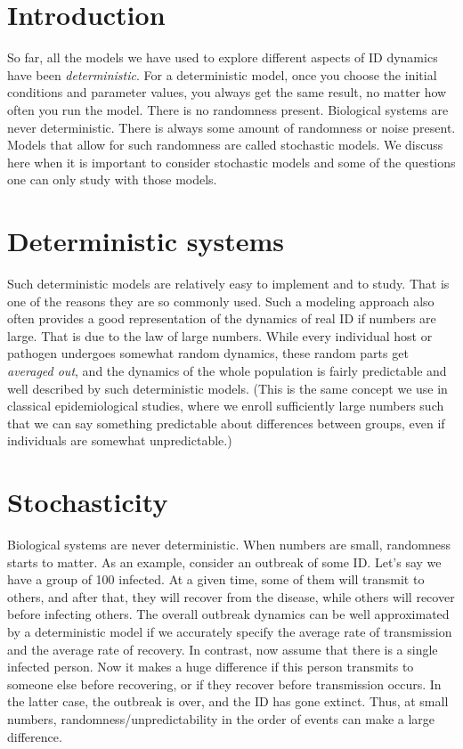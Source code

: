 \documentclass[]{book}
\theoremstyle{definition}
\theoremstyle{definition}
\theoremstyle{definition}
\theoremstyle{remark}
\begin{document}
\hypertarget{introduction-7}{%
\section{Introduction}\label{introduction-7}}

So far, all the models we have used to explore different aspects of ID
dynamics have been \emph{deterministic}. For a deterministic model, once
you choose the initial conditions and parameter values, you always get
the same result, no matter how often you run the model. There is no
randomness present. Biological systems are never deterministic. There is
always some amount of randomness or noise present. Models that allow for
such randomness are called stochastic models. We discuss here when it is
important to consider stochastic models and some of the questions one
can only study with those models.

\hypertarget{deterministic-systems}{%
\section{Deterministic systems}\label{deterministic-systems}}

Such deterministic models are relatively easy to implement and to study.
That is one of the reasons they are so commonly used. Such a modeling
approach also often provides a good representation of the dynamics of
real ID if numbers are large. That is due to the law of large numbers.
While every individual host or pathogen undergoes somewhat random
dynamics, these random parts get \emph{averaged out}, and the dynamics
of the whole population is fairly predictable and well described by such
deterministic models. (This is the same concept we use in classical
epidemiological studies, where we enroll sufficiently large numbers such
that we can say something predictable about differences between groups,
even if individuals are somewhat unpredictable.)

\hypertarget{stochasticity}{%
\section{Stochasticity}\label{stochasticity}}

Biological systems are never deterministic. When numbers are small,
randomness starts to matter. As an example, consider an outbreak of some
ID. Let's say we have a group of 100 infected. At a given time, some of
them will transmit to others, and after that, they will recover from the
disease, while others will recover before infecting others. The overall
outbreak dynamics can be well approximated by a deterministic model if
we accurately specify the average rate of transmission and the average
rate of recovery. In contrast, now assume that there is a single
infected person. Now it makes a huge difference if this person transmits
to someone else before recovering, or if they recover before
transmission occurs. In the latter case, the outbreak is over, and the
ID has gone extinct. Thus, at small numbers, randomness/unpredictability
in the order of events can make a large difference.
\end{document}
